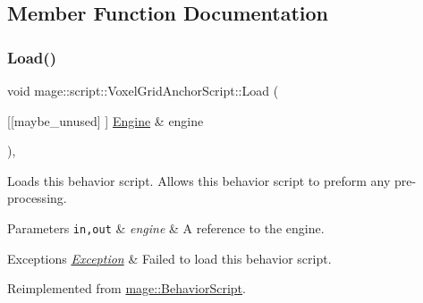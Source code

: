 \subsection{Member Function Documentation}
\mbox{\label{classmage_1_1script_1_1_voxel_grid_anchor_script_aca9d52f124cbedfe7daade62366d4c0a}} 
\subsubsection{\texorpdfstring{Load()}{Load()}}
{\footnotesize\ttfamily void mage\+::script\+::\+Voxel\+Grid\+Anchor\+Script\+::\+Load (\begin{DoxyParamCaption}\item[{\mbox{[}\mbox{[}maybe\+\_\+unused\mbox{]} \mbox{]} \mbox{\hyperlink{classmage_1_1_engine}{Engine}} \&}]{engine }\end{DoxyParamCaption})\hspace{0.3cm}{\ttfamily [override]}, {\ttfamily [virtual]}}

Loads this behavior script. Allows this behavior script to preform any pre-\/processing.


\begin{DoxyParams}[1]{Parameters}
\mbox{\tt in,out}  & {\em engine} & A reference to the engine. \\
\hline
\end{DoxyParams}

\begin{DoxyExceptions}{Exceptions}
{\em \mbox{\hyperlink{classmage_1_1_exception}{Exception}}} & Failed to load this behavior script. \\
\hline
\end{DoxyExceptions}


Reimplemented from \mbox{\hyperlink{classmage_1_1_behavior_script_ae7864876b2ffb1d1d8d8a56e3099f1f2}{mage\+::\+Behavior\+Script}}.

\mbox{\label{classmage_1_1script_1_1_voxel_grid_anchor_script_a7c717a96317052b07c8c90d9c2c73103}} 
